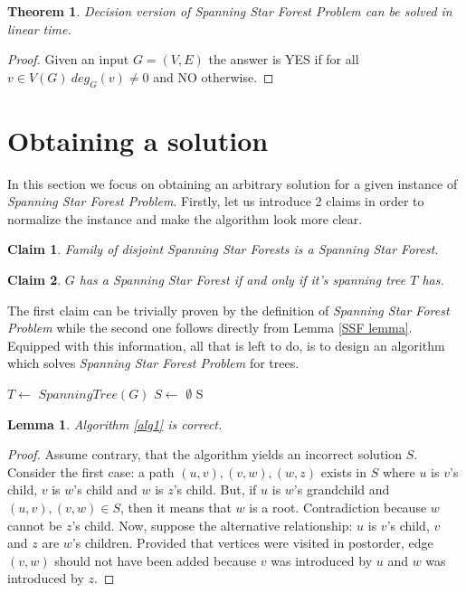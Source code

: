 \documentclass[en]{pracamgr}
\newtheorem{theorem}{Theorem}
\newtheorem{lemma}{Lemma}
\newtheorem{claim}{Claim}
\newcommand{\ssf}{\emph{Spanning Star Forest}}
\newcommand{\ssfp}{\emph{Spanning Star Forest Problem}}
\begin{document}
\begin{theorem}
	Decision version of \ssfp{} can be solved in linear time.
\end{theorem}

\begin{proof}
	Given an input $G = (V,E)$ the answer is YES if for all $v \in V(G)\ deg_G(v) \neq 0$ and NO otherwise.
\end{proof}

\section{Obtaining a solution}

In this section we focus on obtaining an arbitrary solution for a given instance of \ssfp{}. Firstly, let us introduce 2 claims in order to normalize the instance and make the algorithm look more clear.

\begin{claim} \label{SSF sum}
	Family of disjoint {\normalfont Spanning Star Forests} is a \ssf{}.
\end{claim}

\begin{claim} \label{Spanning tree SSF}
	$G$ has a \ssf{} if and only if it's spanning tree $T$ has.
\end{claim}

The first claim can be trivially proven by the definition of \ssfp{} while the second one follows directly from Lemma \ref{SSF lemma}. Equipped with this information, all that is left to do, is to design an algorithm which solves \ssfp{} for trees.

\begin{algorithm}\label{alg1}
	$T \leftarrow$ $SpanningTree(G)$\;
	$S \leftarrow$ $\emptyset$\;
	\Return S
	\caption{Obtaining a Spanning Star Forest from a tree.}
\end{algorithm}

\begin{lemma}\label{alg1 correctness}
	Algorithm \ref{alg1} is correct.
\end{lemma}

\begin{proof}
	Assume contrary, that the algorithm yields an incorrect solution $S$. Consider
	the first case: a path $(u,v),(v,w),(w,z)$ exists in $S$ where $u$ is $v$'s 
	child, $v$ is $w$'s child and $w$ is $z$'s child. But, if $u$ is $w$'s
	grandchild and $(u,v),(v,w) \in S$, then it means that $w$ is a root. 
	Contradiction because $w$ cannot be $z$'s child.
	Now, suppose the alternative relationship: $u$ is $v$'s child, $v$ and $z$ are
	$w$'s children. Provided that vertices were visited in postorder, edge $(v,w)$
	should not have been added because $v$ was introduced by $u$ and $w$ was
	introduced by $z$.
\end{proof}
\end{document}
